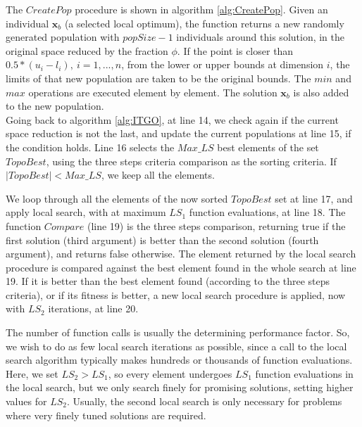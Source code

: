 The $CreatePop$ procedure is shown in algorithm \ref{alg:CreatePop}. Given an individual $\bm{x}_b$ (a selected local optimum), the function returns a new randomly generated population with $popSize-1$ individuals around this solution, in the original space reduced by the fraction $\phi$. If the point is closer than $0.5 * (u_i - l_i), \ i = 1, ..., n$, from the lower or upper bounds at dimension $i$, the limits of that new population are taken to be the original bounds. The $min$ and $max$ operations are executed element by element. The solution $\bm{x}_b$ is also added to the new population.\\[-1em]





Going back to algorithm \ref{alg:ITGO}, at line 14, we check again if the current space reduction is not the last, and update the current populations at line 15, if the condition holds. Line 16 selects the $Max\_LS$ best elements of the set $TopoBest$, using the three steps criteria comparison as the sorting criteria. If $|TopoBest| < Max\_LS$, we keep all the elements.

We loop through all the elements of the now sorted $TopoBest$ set at line 17, and apply local search, with at maximum $LS_1$ function evaluations, at line 18. The function $Compare$ (line 19) is the three steps comparison, returning true if the first solution (third argument) is better than the second solution (fourth argument), and returns false otherwise. The element returned by the local search procedure is compared against the best element found in the whole search at line 19. If it is better than the best element found (according to the three steps criteria), or if its fitness is better, a new local search procedure is applied, now with $LS_2$ iterations, at line 20.


The number of function calls is usually the determining performance factor. So, we wish to do as few local search iterations as possible, since a call to the local search algorithm typically makes hundreds or thousands of function evaluations. Here, we set $LS_2 > LS_1$, so every element undergoes $LS_1$ function evaluations in the local search, but we only search finely for promising solutions, setting higher values for $LS_2$. Usually, the second local search is only necessary for problems where very finely tuned solutions are required.

